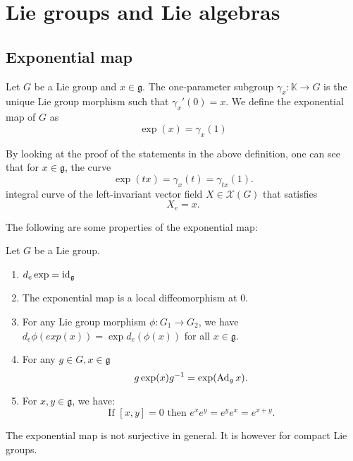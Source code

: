 \documentclass{report}
\begin{document}
\chapter{Lie groups and Lie algebras}
\section{Exponential map}
\begin{definition}
    Let $G$ be a Lie group and $x \in \mathfrak g$.
    The one-parameter subgroup $\gamma_x: \mathbb K \to G$ is the unique Lie group morphism such that $\gamma_x'(0) = x$.
    We define the exponential map of $G$ as
    \[
    \exp(x) = \gamma_x(1)
    \]
\end{definition}
\begin{remark}
    By looking at the proof of the statements in the above definition, one can see that for $x\in \mathfrak g$, the curve
    \[
    \exp(tx) = \gamma_x(t) = \gamma_{tx}(1).
    \]
    integral curve of the left-invariant vector field $X \in \mathcal X(G)$ that satisfies
    \[
    X_e = x.
    \]
\end{remark}

The following are some properties of the exponential map:
\begin{theorem}
    Let $G$ be a Lie group.
    \begin{enumerate}[label = (\roman*)]
        \item $d_{e} \exp = \operatorname{id}_{\mathfrak g}$
        \item The exponential map is a local diffeomorphism at $0$.
        \item For any Lie group morphism $\phi:G_1 \to G_2$, we have $d_e \phi (exp(x)) = \exp d_e (\phi(x))$ for all $x\in \mathfrak g$.
        \item For any $g \in G, x \in \mathfrak g$
        \[
        g \exp(x) g^{-1} = \exp(\operatorname{Ad}_g x).
        \]
        \item For $x, y \in \mathfrak g$, we have:
        \[
        \text{If } [x,y] = 0 \text{ then } e^x e^y = e^y e^x = e^{x+y}.
        \]
    \end{enumerate}
\end{theorem}

\begin{remark}
    The exponential map is not surjective in general. It is however for compact Lie groups.
\end{remark}
\end{document}
